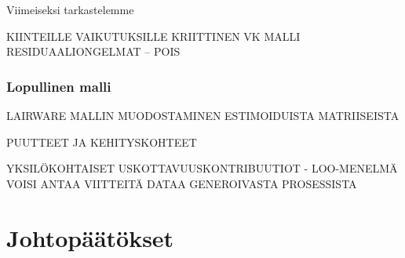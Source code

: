 \documentclass[finnish]{docopts}
\begin{document}
Viimeiseksi tarkastelemme 

KIINTEILLE VAIKUTUKSILLE KRIITTINEN VK MALLI RESIDUAALIONGELMAT -- POIS

\subsubsection{Lopullinen malli}

LAIRWARE MALLIN MUODOSTAMINEN ESTIMOIDUISTA MATRIISEISTA

PUUTTEET JA KEHITYSKOHTEET

YKSILÖKOHTAISET USKOTTAVUUSKONTRIBUUTIOT - LOO-MENELMÄ VOISI ANTAA VIITTEITÄ DATAA GENEROIVASTA PROSESSISTA

\section{Johtopäätökset}


\nocite{*}
%
%
%




\lastpage

\appendices

\pagestyle{empty}

\end{document}
